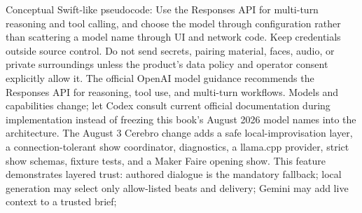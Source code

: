 {}Conceptual Swift-like pseudocode:\markdownRendererInterblockSeparator
{}\markdownRendererInterblockSeparator
{}Use the Responses API for multi-turn reasoning and tool calling, and choose the\markdownRendererSoftLineBreak
{}model through configuration rather than scattering a model name through UI and\markdownRendererSoftLineBreak
{}network code. Keep credentials outside source control. Do not send secrets,\markdownRendererSoftLineBreak
{}pairing material, faces, audio, or private surroundings unless the product's\markdownRendererSoftLineBreak
{}data policy and operator consent explicitly allow it.\markdownRendererInterblockSeparator
{}\markdownRendererSectionBegin
{}\markdownRendererInterblockSeparator
{}\markdownRendererInterblockSeparator
{}The official OpenAI model guidance recommends the Responses API for reasoning,\markdownRendererSoftLineBreak
{}tool use, and multi-turn workflows. Models and capabilities change; let Codex\markdownRendererSoftLineBreak
{}consult current official documentation during implementation instead of\markdownRendererSoftLineBreak
{}freezing this book's August 2026 model names into the architecture.\markdownRendererInterblockSeparator
{}\markdownRendererThematicBreak{}\markdownRendererInterblockSeparator
{}
\markdownRendererSectionEnd 
\markdownRendererSectionEnd \markdownRendererSectionBegin
{}\markdownRendererInterblockSeparator
{}The August 3 Cerebro change adds a safe local-improvisation layer, a\markdownRendererSoftLineBreak
{}connection-tolerant show coordinator, diagnostics, a llama.cpp provider, strict\markdownRendererSoftLineBreak
{}show schemas, fixture tests, and a Maker Faire opening show.\markdownRendererParagraphSeparator
{}This feature demonstrates layered trust:\markdownRendererInterblockSeparator
{}\markdownRendererUlBegin
\markdownRendererUlItem authored dialogue is the mandatory fallback;\markdownRendererUlItemEnd 
\markdownRendererUlItem local generation may select only allow-listed beats and delivery;\markdownRendererUlItemEnd 
\markdownRendererUlItem Gemini may add live context to a trusted brief;\markdownRendererUlItemEnd 
